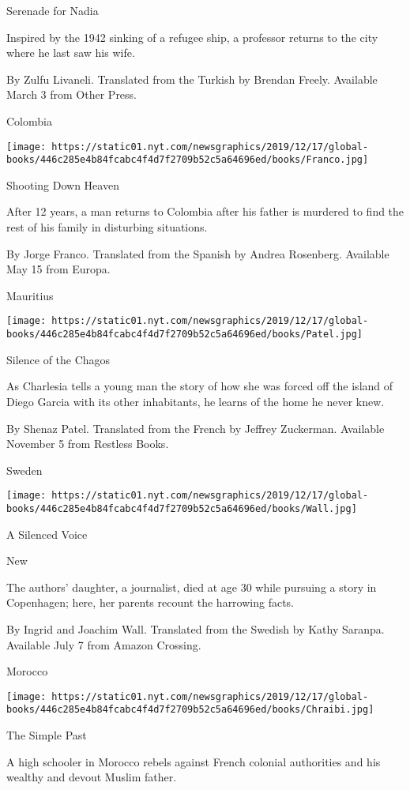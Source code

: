 Serenade for Nadia

Inspired by the 1942 sinking of a refugee ship, a professor returns to
the city where he last saw his wife.

 By Zulfu Livaneli. Translated from the Turkish by Brendan Freely.
Available March 3 from Other Press.

Colombia

\texttt{[image: https://static01.nyt.com/newsgraphics/2019/12/17/global-books/446c285e4b84fcabc4f4d7f2709b52c5a64696ed/books/Franco.jpg]}

Shooting Down Heaven

After 12 years, a man returns to Colombia after his father is murdered
to find the rest of his family in disturbing situations.

 By Jorge Franco. Translated from the Spanish by Andrea Rosenberg.
Available May 15 from Europa.

Mauritius

\texttt{[image: https://static01.nyt.com/newsgraphics/2019/12/17/global-books/446c285e4b84fcabc4f4d7f2709b52c5a64696ed/books/Patel.jpg]}

Silence of the Chagos

As Charlesia tells a young man the story of how she was forced off the
island of Diego Garcia with its other inhabitants, he learns of the home
he never knew.

 By Shenaz Patel. Translated from the French by Jeffrey Zuckerman.
Available November 5 from Restless Books.

Sweden

\texttt{[image: https://static01.nyt.com/newsgraphics/2019/12/17/global-books/446c285e4b84fcabc4f4d7f2709b52c5a64696ed/books/Wall.jpg]}

A Silenced Voice

New

The authors' daughter, a journalist, died at age 30 while pursuing a
story in Copenhagen; here, her parents recount the harrowing facts.

 By Ingrid and Joachim Wall. Translated from the Swedish by Kathy
Saranpa. Available July 7 from Amazon Crossing.

Morocco

\texttt{[image: https://static01.nyt.com/newsgraphics/2019/12/17/global-books/446c285e4b84fcabc4f4d7f2709b52c5a64696ed/books/Chraibi.jpg]}

The Simple Past

A high schooler in Morocco rebels against French colonial authorities
and his wealthy and devout Muslim father.

